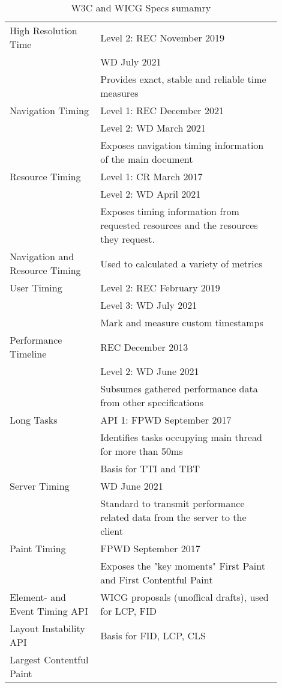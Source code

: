 \begin{table}[h]
	\small
	\centering
	\begin{tabular}{ | p{0.3\linewidth} | p{0.6\linewidth} | }
	\hline
	High Resolution Time
	& Level 2: REC November 2019 \\
	& WD July 2021 \\
	& Provides exact, stable and reliable time measures \\
	\hline
	Navigation Timing
	& Level 1: REC December 2021 \\
	& Level 2: WD March 2021 \\
	& Exposes navigation timing information of the main document \\
	\hline
	Resource Timing
	& Level 1: CR March 2017 \\
	& Level 2: WD April 2021 \\
	& Exposes timing information from requested resources and the resources they request.  \\
	\hline
	Navigation and Resource Timing
	& Used to calculated a variety of metrics \\
	\hline
	User Timing
	& Level 2: REC February 2019 \\
	& Level 3: WD July 2021 \\
	& Mark and measure custom timestamps \\
	\hline
	Performance Timeline
	& REC December 2013 \\
	& Level 2: WD June 2021 \\
	& Subsumes gathered performance data from other specifications \\
	\hline
	Long Tasks
	& API 1: FPWD  September 2017 \\
	& Identifies tasks occupying main thread for more than 50ms \\
	& Basis for TTI and TBT \\
	\hline
	Server Timing
	& WD June 2021 \\
	& Standard to transmit performance related data from the server to the client \\
	\hline
	Paint Timing
	& FPWD September 2017 \\
	& Exposes the "key moments" First Paint and First Contentful Paint \\
	\hline
	Element- and Event Timing API & WICG proposals (unoffical drafts), used for LCP, FID  \\
	Layout Instability API & Basis for FID, LCP, CLS \\ %
	Largest Contentful Paint & \\
	\hline
	\end{tabular}
	\medskip
	\caption{W3C and WICG Specs sumamry}
	\label{table:apis_summary} %
\end{table}


